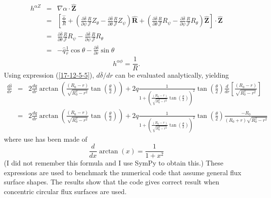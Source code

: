 \documentclass{article}
\newcommand{\tmmathbf}[1]{\ensuremath{\boldsymbol{#1}}}
\begin{document}
\begin{eqnarray*}
  h^{\alpha Z} & = & \nabla \alpha \cdot \hat{\mathbf{Z}}\\
  & = & \left[ \frac{\hat{\tmmathbf{\phi}}}{R} + \left( \frac{\partial
  \overline{\delta}}{\partial \psi} \frac{R}{\mathcal{J}} Z_{\theta} -
  \frac{\partial \overline{\delta}}{\partial \theta} \frac{R}{\mathcal{J}}
  Z_{\psi} \right) \hat{\mathbf{R}} + \left( \frac{\partial
  \overline{\delta}}{\partial \theta} \frac{R}{\mathcal{J}} R_{\psi} -
  \frac{\partial \overline{\delta}}{\partial \psi} \frac{R}{\mathcal{J}}
  R_{\theta} \right) \hat{\mathbf{Z}} \right] \cdot \hat{\mathbf{Z}}\\
  & = & \frac{\partial \overline{\delta}}{\partial \theta}
  \frac{R}{\mathcal{J}} R_{\psi} - \frac{\partial \overline{\delta}}{\partial
  \psi} \frac{R}{\mathcal{J}} R_{\theta}\\
  & = & - \hat{q} \frac{1}{r} \cos \theta - \frac{\partial
  \overline{\delta}}{\partial r} \sin \theta
\end{eqnarray*}
\begin{equation}
  h^{\alpha \phi} = \frac{1}{R} .
\end{equation}
Using expression (\ref{17-12-5-5}), $d \overline{\delta} / d r$ can be
evaluated analytically, yielding
\begin{eqnarray*}
  \frac{d \overline{\delta}}{d r} & = & 2 \frac{d q}{d r} \arctan \left(
  \frac{(R_0 - r)}{\sqrt{R_0^2 - r^2}} \tan \left( \frac{\theta}{2} \right)
  \right) + 2 q \frac{1}{1 + \left( \frac{(R_0 - r)}{\sqrt{R_0^2 - r^2}} \tan
  \left( \frac{\theta}{2} \right) \right)^2} \tan \left( \frac{\theta}{2}
  \right) \frac{d}{d r} \left[ \frac{(R_0 - r)}{\sqrt{R_0^2 - r^2}} \right]\\
  & = & 2 \frac{d q}{d r} \arctan \left( \frac{(R_0 - r)}{\sqrt{R_0^2 - r^2}}
  \tan \left( \frac{\theta}{2} \right) \right) + 2 q \frac{1}{1 + \left(
  \frac{(R_0 - r)}{\sqrt{R_0^2 - r^2}} \tan \left( \frac{\theta}{2} \right)
  \right)^2} \tan \left( \frac{\theta}{2} \right) \frac{- R_0}{(R_0 + r)
  \sqrt{R_0^2 - r^2}}
\end{eqnarray*}
where use has been made of
\[ \frac{d}{d x} \arctan (x) = \frac{1}{1 + x^2} \]
(I did not remember this formula and I use SymPy to obtain this.) These
expressions are used to benchmark the numerical code that assume general flux
surface shapes. The results show that the code gives correct result when
concentric circular flux surfaces are used.

\
\end{document}
